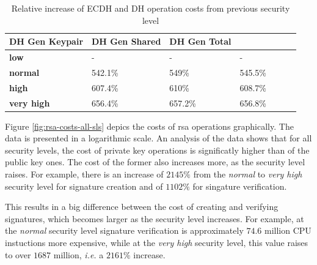 \documentclass{llncs}
\begin{document}
\begin{table}[]
  \begin{tabular}{|l|l|l|l|l|l|l|}
  \hline
                     \textbf{DH Gen Keypair} & \textbf{DH Gen Shared} & \textbf{DH Gen Total} \\ \hline
  \textbf{low}       & -                       & -                      & -                    \\ \hline
  \textbf{normal}    & 542.1\%                 & 549\%                  & 545.5\%               \\ \hline
  \textbf{high}      & 607.4\%                 & 610\%                  & 608.7\%               \\ \hline
  \textbf{very high} & 656.4\%                 & 657.2\%                & 656.8\%               \\ \hline
  \end{tabular}
  \caption{\label{table:dh-realative-cost-increase} Relative increase of ECDH and DH operation costs from previous security level}
  \end{table}



Figure \ref{fig:rsa-costs-all-sls} depics the costs of \gls{rsa} operations graphically. The data is presented in a logarithmic
scale. An analysis of the data shows that for all security levels, the cost of private key operations is significatly higher than
of the public key ones. The cost of the former also increases more, as the security level raises. For example, there is an increase
of $2145\%$ from the \textit{normal} to \textit{very high} security level for signature creation and of $1102\%$ for singature verification.

This results in a big difference between the cost of creating and verifying signatures, which becomes larger as the security level increases. 
For example,
at the \textit{normal} security level signature verification is approximately $74.6$ million CPU instuctions more expensive,
while at the \textit{very high} security level, this value raises to over $1687$ million, \textit{i.e.} a $2161\%$ increase.
\end{document}
